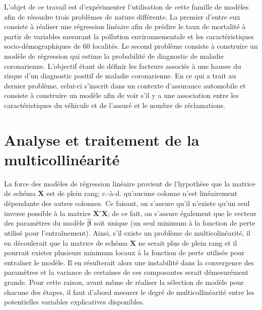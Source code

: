 \documentclass{article}
\begin{document}
L'objet de ce travail est d'expérimenter l'utilisation de cette famille de modèles afin de résoudre trois problèmes de nature différente. 
%
La premier d'entre eux consiste à réaliser une régression linéaire afin de prédire le taux de mortalité à partir de variables mesurant la pollution environnementale et les caractéristiques socio-démographiques de 60 localités.
%
Le second problème consiste à construire un modèle de régression qui estime
la probabilité de diagnostic de maladie coronarienne. L'objectif étant de définir les facteurs associés à une hausse du risque d’un diagnostic positif de maladie coronarienne.
%
En ce qui a trait au dernier problème, celui-ci s'inscrit dans un contexte d'assurance automobile et consiste à construire un modèle afin de voir s’il y a une association entre les caractéristiques du véhicule et de l'assuré et le nombre de réclamations.

\section{Analyse et traitement de la multicollinéarité}\label{sect_multicollinearite}
La force des modèles de régression linéaire provient de l'hypothèse que la matrice de schéma $\boldsymbol{X}$ est de plein rang; c.-à-d. qu'aucune colonne n'est linéairement dépendante des autres colonnes. Ce faisant, on s'assure qu'il n'existe qu'un seul inverse possible à la matrice $\boldsymbol{X}'\boldsymbol{X}$; de ce fait, on s'assure également que le vecteur des paramètres du modèle $\hat{\boldsymbol{\beta}}$ soit unique (un seul minimum à la fonction de perte utilisé pour l'entraînement). Ainsi, s'il existe un problème de multicolinéarité, il en découlerait que la matrice de schéma $\boldsymbol{X}$ ne serait plus de plein rang et il pourrait exister plusieurs minimum locaux à la fonction de perte utilisée pour entraîner le modèle. Il en résulterait alors une instabilité dans la convergence des paramètres et la variance de certaines de ces composantes serait démesurément grande.
%
Pour cette raison, avant même de réaliser la sélection de modèle pour chacune des étapes, il faut d'abord mesurer le degré de multicollinéarité entre les potentielles variables explicatives disponibles.\\
\end{document}
